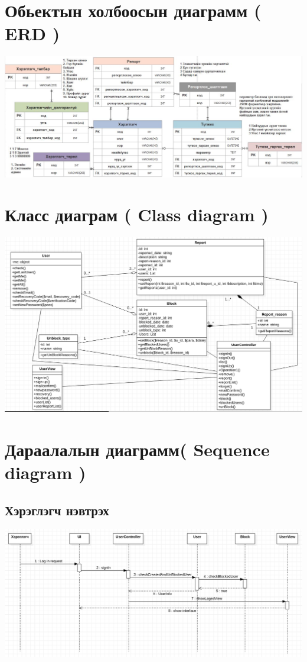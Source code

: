 \documentclass[
oneside, %
english, %
onehalfspacing, %
nolistspacing, %
headsepline, %
]{article} %
\begin{document}
     \section{Обьектын холбоосын диаграмм ( ERD )}
     \includegraphics[width=\textwidth]{ERDagram}
     
      \section{Класс диаграм ( Class diagram )}
     \includegraphics[width=\textwidth]{classdiagram}
     
     \section{Дараалалын диаграмм( Sequence diagram )}
     \subsection{Хэрэглэгч нэвтрэх}
     \includegraphics[width=\textwidth]{loginAccess}
\end{document}
